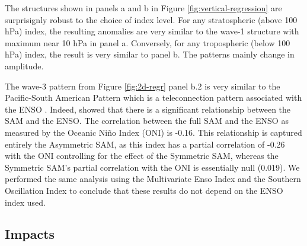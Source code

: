 \documentclass[twocol]{ametsocV5}
\begin{document}
The structures shown in panels a and b in Figure
\ref{fig:vertical-regression} are surprisignly robust to the choice of
index level. For any stratospheric (above 100 hPa) index, the resulting
anomalies are very similar to the wave-1 structure with maximum near 10
hPa in panel a. Conversely, for any tropospheric (below 100 hPa) index,
the result is very similar to panel b. The patterns mainly change in
amplitude.

The wave-3 pattern from Figure \ref{fig:2d-regr} panel b.2 is very
similar to the Pacific-South American Pattern \citep{mo1987, kidson1988}
which is a teleconnection pattern associated with the ENSO
\citep{karoly1989}. Indeed, \citet{fogt2011} showed that there is a
significant relationship between the SAM and the ENSO. The correlation
between the full SAM and the ENSO as measured by the Oceanic Niño Index
\citep{bamston1997} (ONI) is -0.16. This relationship is captured
entirely the Asymmetric SAM, as this index has a partial correlation of
-0.26 with the ONI controlling for the effect of the Symmetric SAM,
whereas the Symmetric SAM's partial correlation with the ONI is
essentially null (0.019). We performed the same analysis using the
Multivariate Enso Index \citep{wolter2011} and the Southern Oscillation
Index \citep{ropelewski1987} to conclude that these results do not
depend on the ENSO index used.

\subsection{Impacts}
\end{document}
